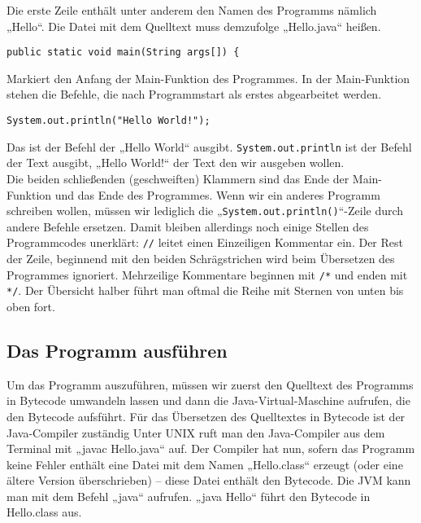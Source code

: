 Die erste Zeile enthält unter anderem den Namen des Programms nämlich „Hello“. Die Datei mit dem Quelltext muss demzufolge „Hello.java“ heißen. \\
\begin{lstlisting}
public static void main(String args[]) {
\end{lstlisting}
Markiert den Anfang der Main-Funktion des Programmes. In der Main-Funktion stehen die Befehle, die nach Programmstart als erstes abgearbeitet werden. \\
\begin{lstlisting}
System.out.println("Hello World!");
\end{lstlisting}
Das ist der Befehl der „Hello World“ ausgibt. \lstinline$System.out.println$ ist der Befehl der Text ausgibt, „Hello World!“ der Text den wir ausgeben wollen. \\
Die beiden schließenden (geschweiften) Klammern sind das Ende der Main-Funktion und das Ende des Programmes. 
Wenn wir ein anderes Programm schreiben wollen, müssen wir lediglich die „\lstinline$System.out.println()$“-Zeile durch andere Befehle ersetzen.
Damit bleiben allerdings noch einige Stellen des Programmcodes unerklärt: \lstinline$//$ leitet einen Einzeiligen Kommentar ein. Der Rest der Zeile, beginnend mit den beiden Schrägstrichen wird beim Übersetzen des Programmes ignoriert.
Mehrzeilige Kommentare beginnen mit \lstinline$/*$ und enden mit \lstinline$*/$. Der Übersicht halber führt man oftmal die Reihe mit Sternen von unten bis oben fort.


\subsection{Das Programm ausführen}
Um das Programm auszuführen, müssen wir zuerst den Quelltext des Programms in Bytecode umwandeln lassen und dann die Java-Virtual-Maschine aufrufen, die den Bytecode aufsführt. 
Für das Übersetzen des Quelltextes in Bytecode ist der Java-Compiler zuständig
Unter UNIX ruft man den Java-Compiler aus dem Terminal mit „javac Hello.java“ auf. Der Compiler hat nun, sofern das Programm keine Fehler enthält eine Datei mit dem Namen „Hello.class“ erzeugt (oder eine ältere Version überschrieben) – diese Datei enthält den Bytecode.
Die JVM kann man mit dem Befehl „java“ aufrufen. „java Hello“ führt den Bytecode in Hello.class aus.
